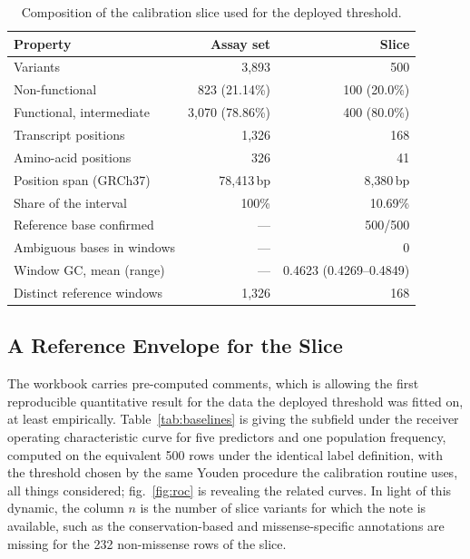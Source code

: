 \documentclass[10pt,journal]{IEEEtran}
\begin{document}
\begin{table}[!t]
\caption{Composition of the calibration slice used for the deployed threshold.}
\label{tab:slice}
\centering
\footnotesize
\begin{tabular}{@{}lrr@{}}
\toprule
Property & Assay set & Slice \\
\midrule
Variants & 3{,}893 & 500 \\
Non-functional & 823 (21.14\%) & 100 (20.0\%) \\
Functional, intermediate & 3{,}070 (78.86\%) & 400 (80.0\%) \\
Transcript positions & 1{,}326 & 168 \\
Amino-acid positions & 326 & 41 \\
Position span (GRCh37) & 78{,}413\,bp & 8{,}380\,bp \\
Share of the interval & 100\% & 10.69\% \\
Reference base confirmed & --- & 500/500 \\
Ambiguous bases in windows & --- & 0 \\
Window GC, mean (range) & --- & 0.4623 (0.4269--0.4849) \\
Distinct reference windows & 1{,}326 & 168 \\
\bottomrule
\end{tabular}
\end{table}

\subsection{A Reference Envelope for the Slice}
\label{sec:res-baselines}

The workbook carries pre-computed comments, which is allowing the first reproducible quantitative result for the data the deployed threshold was fitted on, at least empirically. Table~\ref{tab:baselines} is giving the subfield under the receiver operating characteristic curve for five predictors and one population frequency, computed on the equivalent 500 rows under the identical label definition, with the threshold chosen by the same Youden procedure the calibration routine uses, all things considered; fig.~\ref{fig:roc} is revealing the related curves. In light of this dynamic, the column $n$ is the number of slice variants for which the note is available, such as the conservation-based and missense-specific annotations are missing for the 232 non-missense rows of the slice.
\end{document}
